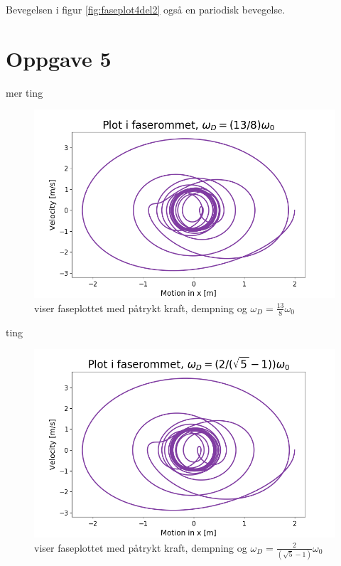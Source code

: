 \documentclass[norsk,a4paper,12pt]{article}
\begin{document}
Bevegelsen i figur \ref{fig:faseplot4del2} også en pariodisk bevegelse.



\section*{Oppgave 5}

mer ting
\begin{figure}[h]
\begin{center}
\includegraphics[scale=0.5]{Oppgave5fase1.png}
\caption{viser faseplottet med påtrykt kraft, dempning og $\omega_D = \frac{13}{8}\omega_0$}
\label{fig:faseplot5del1.png}
\end{center}
\end{figure}



ting


\begin{figure}[h]
\begin{center}
\includegraphics[scale=0.5]{Oppgave5fase2.png}
\caption{viser faseplottet med påtrykt kraft, dempning og $\omega_D = \frac{2}{\left(\sqrt{5}-1 \right)}\omega_0$}
\label{fig:faseplot5del2.png}
\end{center}
\end{figure}
\end{document}
